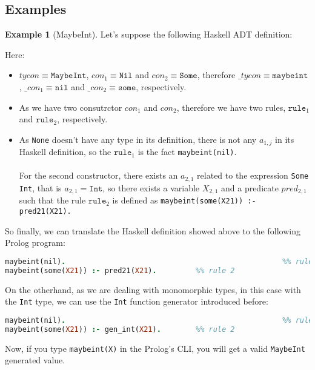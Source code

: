 \documentclass{report}
\theoremstyle{definition}
\newtheorem{example}{Example}[section]
\theoremstyle{definition}
\newcommand{\ttt}[1]{\texttt{#1}}
\begin{document}
\subsection{Examples}
\begin{example}[MaybeInt]
	Let's suppose the following Haskell ADT definition:
	
	Here:
	\begin{itemize}
		\item $tycon \equiv \ttt{MaybeInt}$, $con_1 \equiv \ttt{Nil}$ and $con_2 \equiv \ttt{Some}$, therefore $\_tycon \equiv \ttt{maybeint}$, $\_con_1 \equiv \ttt{nil}$ and $\_con_2 \equiv \ttt{some}$, respectively.
		\item As we have two consutrctor $con_1$ and $con_2$, therefore we have two rules, $\ttt{rule}_1$ and $\ttt{rule}_2$, respectively.
		\item As \ttt{None} doesn't have any type in its definition, there is not any $a_{1,j}$ in its Haskell definition, so the $\ttt{rule}_1$ is the fact \ttt{maybeint(nil)}.\\\\
		For the second constructor, there exists an $a_{2,1}$ related to the expression \ttt{Some Int}, that is $a_{2,1} = \ttt{Int}$, so there exists a variable $X_{2,1}$ and a predicate $pred_{2,1}$ such that the rule $\ttt{rule}_2$ is defined as \ttt{maybeint(some(X21)) :- pred21(X21).}
	\end{itemize}
	So finally, we can translate the Haskell definition showed above to the following Prolog program:\\
\begin{lstlisting}[language=Prolog]
maybeint(nil).													%% rule 1
maybeint(some(X21)) :- pred21(X21).			%% rule 2
\end{lstlisting}
On the otherhand, as we are dealing with monomorphic types, in this case with the \ttt{Int} type, we can use the \ttt{Int} function generator introduced before:\\
\begin{lstlisting}[language=Prolog]
maybeint(nil).													%% rule 1
maybeint(some(X21)) :- gen_int(X21).		%% rule 2
\end{lstlisting}
Now, if you type \ttt{maybeint(X)} in the Prolog's CLI, you will get a valid \ttt{MaybeInt} generated value.
\end{example}
\end{document}
